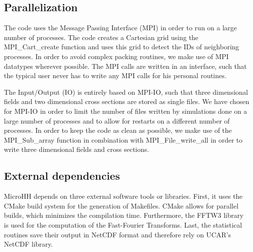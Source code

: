 \documentclass[gmd]{copernicus}
\begin{document}
\subsection{Parallelization}
The code uses the Message Passing Interface (MPI) in order to run on a large number of processes. The code creates a Cartesian grid using the MPI\_Cart\_create function and uses this grid to detect the IDs of neighboring processes. In order to avoid complex packing routines, we make use of MPI datatypes wherever possible. The MPI calls are written in an interface, such that the typical user never has to write any MPI calls for his personal routines.

The Input/Output (IO) is entirely based on MPI-IO, such that three dimensional fields and two dimensional cross sections are stored as single files. We have chosen for MPI-IO in order to limit the number of files written by simulations done on a large number of processes and to allow for restarts on a different number of processes. In order to keep the code as clean as possible, we make use of the MPI\_Sub\_array function in combination with MPI\_File\_write\_all in order to write three dimensional fields and cross sections.

\subsection{External dependencies}
MicroHH depends on three external software tools or libraries. First, it uses the CMake build system for the generation of Makefiles. CMake allows for parallel builds, which minimizes the compilation time. Furthermore, the FFTW3 library is used for the computation of the Fast-Fourier Transforms. Last, the statistical routines save their output in NetCDF format and therefore rely on UCAR's NetCDF library.
\end{document}
